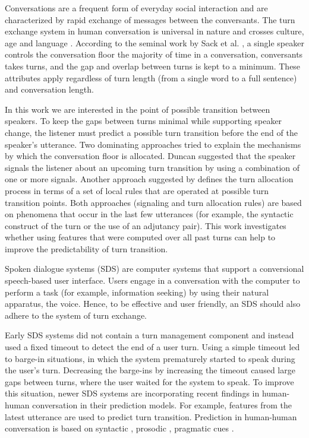 Conversations are a frequent form of everyday social interaction and are characterized by rapid exchange of messages between the conversants.
The turn exchange system in human conversation is universal in nature and crosses culture, age and language \cite{levinson2016turn}. According to the
seminal work by Sack et al. \cite{sacks1974simplest}, a single speaker controls the conversation floor the majority of time in a conversation, conversants takes turns, and the gap and overlap between turns is kept to a minimum. These attributes apply regardless of turn length (from a single word to a full sentence) and conversation length.

In this work we are interested in the point of possible transition between speakers. To keep the gaps between turns minimal while supporting speaker change, the listener
must predict a possible turn transition before the end of the speaker's utterance. Two dominating approaches tried to explain the mechanisms by which
the conversation floor is allocated. Duncan \cite{duncan1972some} suggested that the speaker signals the listener about an upcoming turn transition by using a combination of one or more signals.
Another approach suggested by \cite{sacks1974simplest} defines the turn allocation process in terms of a set of local rules that are operated at possible turn transition points.
Both approaches (signaling and turn allocation rules) are based on phenomena that occur in the last few utterances (for example, the syntactic construct of the turn or the use of an adjutancy pair). This work investigates whether using features that were computed over all past turns can help to improve the predictability of turn transition.

Spoken dialogue systems (SDS) are computer systems that support a conversional speech-based user interface. Users engage in a conversation with the computer to
perform a task (for example, information seeking) by using their natural apparatus, the voice. Hence, to be effective and user friendly, an SDS should also adhere to the system of turn exchange.

Early SDS systems did not contain a turn management component and instead used a fixed timeout to detect the end of a user turn. Using a simple timeout led to barge-in situations, in which the system prematurely started to speak during the user's turn. Decreasing the barge-ins by increasing the timeout caused large gaps between turns, where the user waited for the system to speak.
To improve this situation, newer SDS systems are incorporating recent findings in human-human conversation in their prediction models. For example, features from the latest utterance are used to predict turn transition. Prediction in human-human conversation is based on syntactic \cite{sacks1974simplest,de2006projecting}, prosodic  \cite{ford1996interactional,stolcke2002speaker,ferrer2003prosody}, pragmatic cues  \cite{ford2001intersection}.

